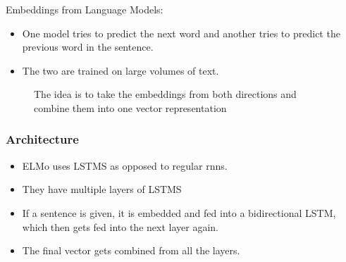 \documentclass[11pt]{article}
\begin{document}
\begin{minipage}[l]{.5\linewidth}
    \begin{figure}[H]
        \centering
    \end{figure}    
\end{minipage}\hfill
\begin{minipage}[r]{.48\linewidth}
    Embeddings from Language Models:
    \begin{itemize}
        \item One model tries to predict the next word and another tries to predict the previous word in the sentence.
        \item The two are trained on large volumes of text.
    \end{itemize}
\end{minipage}

\begin{figure}[H]
    \centering
    \caption*{The idea is to take the embeddings from both directions and combine them into one vector representation}
\end{figure}    

\subsubsection{Architecture}

\begin{minipage}[l]{.5\linewidth}
    \begin{figure}[H]
        \centering
    \end{figure}    
\end{minipage}\hfill
\begin{minipage}[r]{.48\linewidth}
    \begin{itemize}
        \item ELMo uses LSTMS as opposed to regular rnns.
        \item They have multiple layers of LSTMS
        \item If a sentence is given, it is embedded and fed into a bidirectional LSTM, which then gets fed into the next layer again.
        \item The final vector gets combined from all the layers.
    \end{itemize}
\end{minipage}
\end{document}
